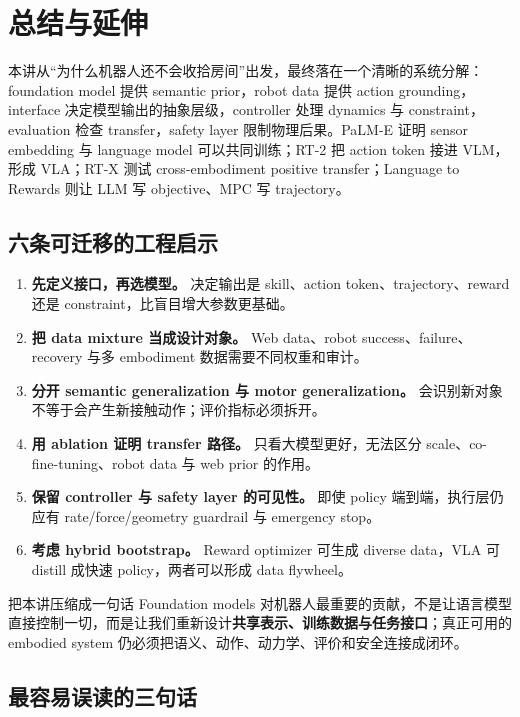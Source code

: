 \section{总结与延伸}

本讲从“为什么机器人还不会收拾房间”出发，最终落在一个清晰的系统分解：foundation model 提供 semantic prior，robot data 提供 action grounding，interface 决定模型输出的抽象层级，controller 处理 dynamics 与 constraint，evaluation 检查 transfer，safety layer 限制物理后果。PaLM-E 证明 sensor embedding 与 language model 可以共同训练；RT-2 把 action token 接进 VLM，形成 VLA；RT-X 测试 cross-embodiment positive transfer；Language to Rewards 则让 LLM 写 objective、MPC 写 trajectory。

\subsection{六条可迁移的工程启示}

\begin{enumerate}
  \item \textbf{先定义接口，再选模型。} 决定输出是 skill、action token、trajectory、reward 还是 constraint，比盲目增大参数更基础。
  \item \textbf{把 data mixture 当成设计对象。} Web data、robot success、failure、recovery 与多 embodiment 数据需要不同权重和审计。
  \item \textbf{分开 semantic generalization 与 motor generalization。} 会识别新对象不等于会产生新接触动作；评价指标必须拆开。
  \item \textbf{用 ablation 证明 transfer 路径。} 只看大模型更好，无法区分 scale、co-fine-tuning、robot data 与 web prior 的作用。
  \item \textbf{保留 controller 与 safety layer 的可见性。} 即使 policy 端到端，执行层仍应有 rate/force/geometry guardrail 与 emergency stop。
  \item \textbf{考虑 hybrid bootstrap。} Reward optimizer 可生成 diverse data，VLA 可 distill 成快速 policy，两者可以形成 data flywheel。
\end{enumerate}

\begin{importantbox}{把本讲压缩成一句话}
Foundation models 对机器人最重要的贡献，不是让语言模型直接控制一切，而是让我们重新设计\textbf{共享表示、训练数据与任务接口}；真正可用的 embodied system 仍必须把语义、动作、动力学、评价和安全连接成闭环。
\end{importantbox}

\subsection{最容易误读的三句话}

